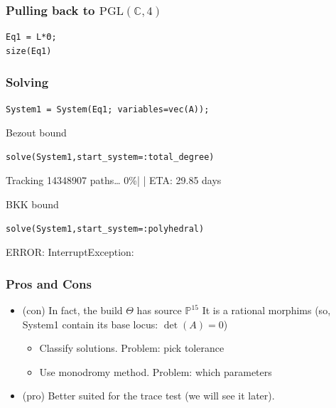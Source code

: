 \documentclass[11pt]{article}
\begin{document}
\subsubsection{Pulling back to \(\mathrm{PGL}(\mathbb{C},4)\)}
\label{sec:org03be674}

\begin{verbatim}
Eq1 = L*Θ;
size(Eq1)
\end{verbatim}

\subsubsection{Solving}
\label{sec:org4f132b6}

\begin{verbatim}
System1 = System(Eq1; variables=vec(A));
\end{verbatim}

Bezout bound
\begin{verbatim}
solve(System1,start_system=:total_degree)
\end{verbatim}

Tracking 14348907 paths\ldots{}   0\%|                        |  ETA: 29.85 days

BKK bound
\begin{verbatim}
solve(System1,start_system=:polyhedral)
\end{verbatim}

ERROR: InterruptException:

\subsubsection{Pros and Cons}
\label{sec:org212474c}

\begin{itemize}
\item (con) In fact, the build \(\Theta\) has source \(\mathbb{P}^{15}\)
It is a rational morphims (so, System1 contain its base locus: \(\det(A)=0\))

\begin{itemize}
\item Classify solutions. Problem: pick tolerance
\item Use monodromy method. Problem: which parameters
\end{itemize}

\item (pro) Better suited for the trace test (we will see it later).
\end{itemize}
\end{document}
